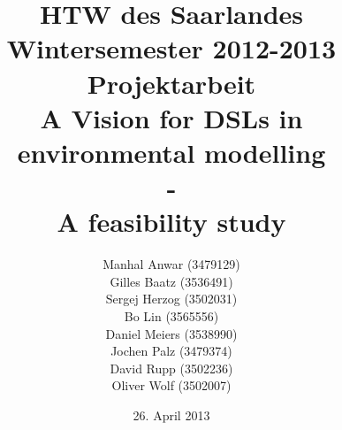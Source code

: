 


\title{%
\large HTW des Saarlandes\\
Wintersemester 2012-2013\\
Projektarbeit\\[10mm]
{\LARGE A Vision for DSLs in environmental modelling}\\
{\LARGE -}\\
{\LARGE A feasibility study}\\[10mm]
}

\author{%
Manhal Anwar (3479129)\\[1mm]
Gilles Baatz (3536491)\\[1mm]
Sergej Herzog (3502031)\\[1mm]
Bo Lin (3565556)\\[1mm]
Daniel Meiers (3538990)\\[1mm]
Jochen Palz (3479374)\\[1mm]
David Rupp (3502236)\\[1mm]
Oliver Wolf (3502007)\\[1mm]
}

\date{26. April 2013}



\maketitle

\tableofcontents
\listoffigures


 













\printbibliography


